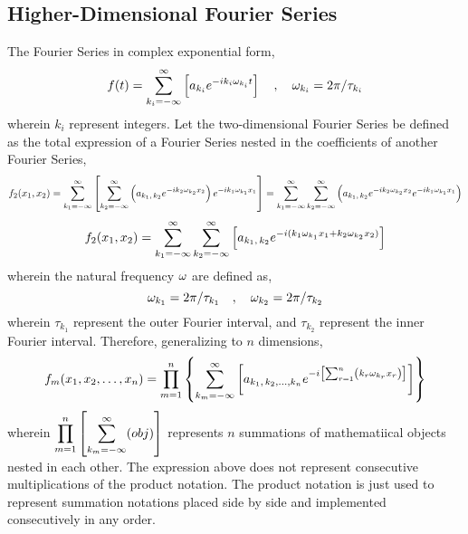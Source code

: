 \documentclass[class=report, 12pt, crop=false]{standalone}
\begin{document}
\begin{center}
\section{Higher-Dimensional Fourier Series}
\begin{comment}
\end{comment}
The Fourier Series in complex exponential form,
$$f(t) = \sum^{\infty}_{k_i = -\infty}\left[a_{k_i}e^{-ik_i\omega_{k_i}t}\right]\quad,\quad \omega_{k_i} = 2\pi/\tau_{k_i}$$
wherein $k_i$ represent integers. Let the two-dimensional Fourier Series be defined as the total expression of a Fourier Series nested in the coefficients of another Fourier Series,
$$f_2(x_1,x_2) = \sum^{\infty}_{k_1 = -\infty}\left[\sum^{\infty}_{k_2 = -\infty}\left(a_{k_1,\,k_2}e^{-ik_2\omega_{k_2}x_2}\right)e^{-ik_1\omega_{k_1}x_1}\right] = \sum^{\infty}_{k_1 = -\infty}\sum^{\infty}_{k_2 = -\infty}\left(a_{k_1,\,k_2}e^{-ik_2\omega_{k_2}x_2}e^{-ik_1\omega_{k_1}x_1}\right)$$
$$f_2(x_1,x_2) = \sum^{\infty}_{k_1 = -\infty}\sum^{\infty}_{k_2 = -\infty}\left[a_{k_1,\,k_2}e^{-i(k_1\omega_{k_1}x_1+k_2\omega_{k_2}x_2)}\right]$$
wherein the natural frequency $\omega$ are defined as,
$$\omega_{k_1} = 2\pi/\tau_{k_1} \quad,\quad \omega_{k_2} = 2\pi/\tau_{k_2}$$
wherein $\tau_{k_1}$ represent the outer Fourier interval, and $\tau_{k_2}$ represent the inner Fourier interval. Therefore, generalizing to $n$ dimensions,
$$f_m(x_1,x_2,\dots,x_n) = \prod^{n}_{m=1}\left\{\sum^{\infty}_{k_m = -\infty}\left[a_{k_1,\,k_2,\dots,k_n}e^{-i\left[\sum^{n}_{r=1}\left(k_r\omega_{k_r}x_r\right)\right]}\right]\right\}$$
wherein $\displaystyle{\prod^{n}_{m=1}\left[\sum^{\infty}_{k_m = -\infty}(obj)\right]}$ represents $n$ summations of mathematiical objects nested in each other. The expression above does not represent consecutive multiplications of the product notation. The product notation is just used to represent summation notations placed side by side and implemented consecutively in any order. 
\end{center}
\end{document}
